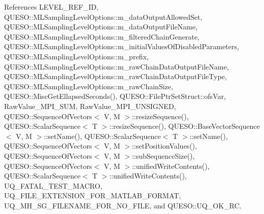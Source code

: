 References L\-E\-V\-E\-L\-\_\-\-R\-E\-F\-\_\-\-I\-D, Q\-U\-E\-S\-O\-::\-M\-L\-Sampling\-Level\-Options\-::m\-\_\-data\-Output\-Allowed\-Set, Q\-U\-E\-S\-O\-::\-M\-L\-Sampling\-Level\-Options\-::m\-\_\-data\-Output\-File\-Name, Q\-U\-E\-S\-O\-::\-M\-L\-Sampling\-Level\-Options\-::m\-\_\-filtered\-Chain\-Generate, Q\-U\-E\-S\-O\-::\-M\-L\-Sampling\-Level\-Options\-::m\-\_\-initial\-Values\-Of\-Disabled\-Parameters, Q\-U\-E\-S\-O\-::\-M\-L\-Sampling\-Level\-Options\-::m\-\_\-prefix, Q\-U\-E\-S\-O\-::\-M\-L\-Sampling\-Level\-Options\-::m\-\_\-raw\-Chain\-Data\-Output\-File\-Name, Q\-U\-E\-S\-O\-::\-M\-L\-Sampling\-Level\-Options\-::m\-\_\-raw\-Chain\-Data\-Output\-File\-Type, Q\-U\-E\-S\-O\-::\-M\-L\-Sampling\-Level\-Options\-::m\-\_\-raw\-Chain\-Size, Q\-U\-E\-S\-O\-::\-Misc\-Get\-Ellapsed\-Seconds(), Q\-U\-E\-S\-O\-::\-File\-Ptr\-Set\-Struct\-::ofs\-Var, Raw\-Value\-\_\-\-M\-P\-I\-\_\-\-S\-U\-M, Raw\-Value\-\_\-\-M\-P\-I\-\_\-\-U\-N\-S\-I\-G\-N\-E\-D, Q\-U\-E\-S\-O\-::\-Sequence\-Of\-Vectors$<$ V, M $>$\-::resize\-Sequence(), Q\-U\-E\-S\-O\-::\-Scalar\-Sequence$<$ T $>$\-::resize\-Sequence(), Q\-U\-E\-S\-O\-::\-Base\-Vector\-Sequence$<$ V, M $>$\-::set\-Name(), Q\-U\-E\-S\-O\-::\-Scalar\-Sequence$<$ T $>$\-::set\-Name(), Q\-U\-E\-S\-O\-::\-Sequence\-Of\-Vectors$<$ V, M $>$\-::set\-Position\-Values(), Q\-U\-E\-S\-O\-::\-Sequence\-Of\-Vectors$<$ V, M $>$\-::sub\-Sequence\-Size(), Q\-U\-E\-S\-O\-::\-Sequence\-Of\-Vectors$<$ V, M $>$\-::unified\-Write\-Contents(), Q\-U\-E\-S\-O\-::\-Scalar\-Sequence$<$ T $>$\-::unified\-Write\-Contents(), U\-Q\-\_\-\-F\-A\-T\-A\-L\-\_\-\-T\-E\-S\-T\-\_\-\-M\-A\-C\-R\-O, U\-Q\-\_\-\-F\-I\-L\-E\-\_\-\-E\-X\-T\-E\-N\-S\-I\-O\-N\-\_\-\-F\-O\-R\-\_\-\-M\-A\-T\-L\-A\-B\-\_\-\-F\-O\-R\-M\-A\-T, U\-Q\-\_\-\-M\-H\-\_\-\-S\-G\-\_\-\-F\-I\-L\-E\-N\-A\-M\-E\-\_\-\-F\-O\-R\-\_\-\-N\-O\-\_\-\-F\-I\-L\-E, and Q\-U\-E\-S\-O\-::\-U\-Q\-\_\-\-O\-K\-\_\-\-R\-C.


